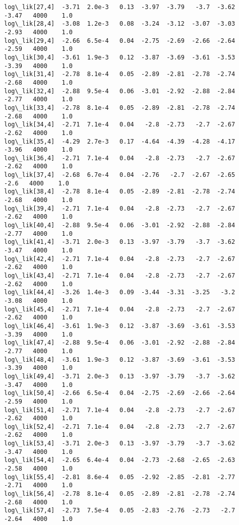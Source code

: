 \documentclass[11pt]{article}
\begin{document}
\begin{Verbatim}[commandchars=\\\{\}]
log\_lik[27,4]  -3.71  2.0e-3   0.13  -3.97  -3.79   -3.7  -3.62  -3.47   4000    1.0
log\_lik[28,4]  -3.08  1.2e-3   0.08  -3.24  -3.12  -3.07  -3.03  -2.93   4000    1.0
log\_lik[29,4]  -2.66  6.5e-4   0.04  -2.75  -2.69  -2.66  -2.64  -2.59   4000    1.0
log\_lik[30,4]  -3.61  1.9e-3   0.12  -3.87  -3.69  -3.61  -3.53  -3.39   4000    1.0
log\_lik[31,4]  -2.78  8.1e-4   0.05  -2.89  -2.81  -2.78  -2.74  -2.68   4000    1.0
log\_lik[32,4]  -2.88  9.5e-4   0.06  -3.01  -2.92  -2.88  -2.84  -2.77   4000    1.0
log\_lik[33,4]  -2.78  8.1e-4   0.05  -2.89  -2.81  -2.78  -2.74  -2.68   4000    1.0
log\_lik[34,4]  -2.71  7.1e-4   0.04   -2.8  -2.73   -2.7  -2.67  -2.62   4000    1.0
log\_lik[35,4]  -4.29  2.7e-3   0.17  -4.64  -4.39  -4.28  -4.17  -3.96   4000    1.0
log\_lik[36,4]  -2.71  7.1e-4   0.04   -2.8  -2.73   -2.7  -2.67  -2.62   4000    1.0
log\_lik[37,4]  -2.68  6.7e-4   0.04  -2.76   -2.7  -2.67  -2.65   -2.6   4000    1.0
log\_lik[38,4]  -2.78  8.1e-4   0.05  -2.89  -2.81  -2.78  -2.74  -2.68   4000    1.0
log\_lik[39,4]  -2.71  7.1e-4   0.04   -2.8  -2.73   -2.7  -2.67  -2.62   4000    1.0
log\_lik[40,4]  -2.88  9.5e-4   0.06  -3.01  -2.92  -2.88  -2.84  -2.77   4000    1.0
log\_lik[41,4]  -3.71  2.0e-3   0.13  -3.97  -3.79   -3.7  -3.62  -3.47   4000    1.0
log\_lik[42,4]  -2.71  7.1e-4   0.04   -2.8  -2.73   -2.7  -2.67  -2.62   4000    1.0
log\_lik[43,4]  -2.71  7.1e-4   0.04   -2.8  -2.73   -2.7  -2.67  -2.62   4000    1.0
log\_lik[44,4]  -3.26  1.4e-3   0.09  -3.44  -3.31  -3.25   -3.2  -3.08   4000    1.0
log\_lik[45,4]  -2.71  7.1e-4   0.04   -2.8  -2.73   -2.7  -2.67  -2.62   4000    1.0
log\_lik[46,4]  -3.61  1.9e-3   0.12  -3.87  -3.69  -3.61  -3.53  -3.39   4000    1.0
log\_lik[47,4]  -2.88  9.5e-4   0.06  -3.01  -2.92  -2.88  -2.84  -2.77   4000    1.0
log\_lik[48,4]  -3.61  1.9e-3   0.12  -3.87  -3.69  -3.61  -3.53  -3.39   4000    1.0
log\_lik[49,4]  -3.71  2.0e-3   0.13  -3.97  -3.79   -3.7  -3.62  -3.47   4000    1.0
log\_lik[50,4]  -2.66  6.5e-4   0.04  -2.75  -2.69  -2.66  -2.64  -2.59   4000    1.0
log\_lik[51,4]  -2.71  7.1e-4   0.04   -2.8  -2.73   -2.7  -2.67  -2.62   4000    1.0
log\_lik[52,4]  -2.71  7.1e-4   0.04   -2.8  -2.73   -2.7  -2.67  -2.62   4000    1.0
log\_lik[53,4]  -3.71  2.0e-3   0.13  -3.97  -3.79   -3.7  -3.62  -3.47   4000    1.0
log\_lik[54,4]  -2.65  6.4e-4   0.04  -2.73  -2.68  -2.65  -2.63  -2.58   4000    1.0
log\_lik[55,4]  -2.81  8.6e-4   0.05  -2.92  -2.85  -2.81  -2.77  -2.71   4000    1.0
log\_lik[56,4]  -2.78  8.1e-4   0.05  -2.89  -2.81  -2.78  -2.74  -2.68   4000    1.0
log\_lik[57,4]  -2.73  7.5e-4   0.05  -2.83  -2.76  -2.73   -2.7  -2.64   4000    1.0

\end{Verbatim}
\end{document}
